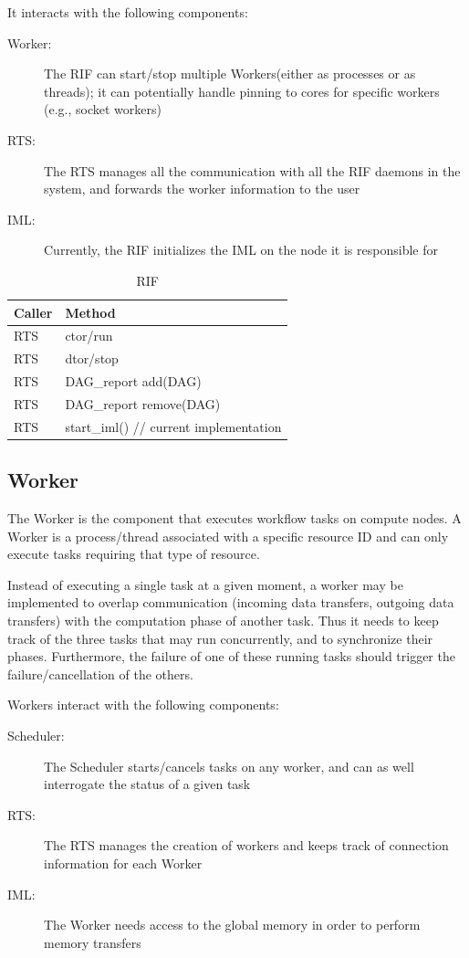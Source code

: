 \documentclass[10pt]{article}
\newcommand{\rts}{RTS\xspace}
\newcommand{\sched}{Scheduler\xspace}
\newcommand{\worker}{Worker\xspace}
\newcommand{\workers}{Workers\xspace}
\newcommand{\iml}{IML\xspace}
\newcommand{\rif}{RIF\xspace}
\newcommand{\rdag}{DAG\xspace}
\newcommand{\rdagrep}{DAG\_report\xspace}
\begin{document}
It interacts with the following components:
\begin{description}
    \item [\worker:] The \rif can start/stop multiple \workers (either as
    processes or as threads); it can potentially handle pinning to cores for
    specific workers (e.g., socket workers)
    \item [\rts:] The \rts manages all the communication with all the \rif
    daemons in the system, and forwards the worker information to the user
    \item [\iml:] Currently, the \rif initializes the \iml on the node it is 
    responsible for
\end{description}
%
\begin{table}[ht]
    \centering
    \caption{RIF}
    \label{tab:rif}
    \bgroup
    \setlength{\tabcolsep}{2em}
    \begin{tabular}{ll}
        \toprule
        Caller & Method \\
        \midrule
        \rts & ctor/run \\
        \rts & dtor/stop \\
        \rts & \rdagrep add(\rdag)  \\
        \rts & \rdagrep remove(\rdag) \\
        \midrule
        \rts & start\_iml() // current implementation \\
        \bottomrule
    \end{tabular}
    \egroup
\end{table}
%

\subsection{Worker}
The \worker is the component that executes workflow tasks on compute nodes. A
\worker is a process/thread associated with a specific resource ID and can only
execute tasks requiring that type of resource.

Instead of executing a single task at a given moment, a worker may be
implemented to overlap communication (incoming data transfers, outgoing data
transfers) with the computation phase of another task.
Thus it needs to keep track of the three tasks that may run concurrently, and to
synchronize their phases.
Furthermore, the failure of one of these running tasks should  trigger the
failure/cancellation of the others.

\workers interact with the following components:
\begin{description}
    \item [\sched:] The \sched starts/cancels tasks on any worker, and can as
    well interrogate the status of a given task
    \item [\rts:] The \rts manages the creation of workers and keeps track of
    connection information for each \worker
    \item [\iml:] The \worker needs access to the global memory in order to
    perform memory transfers
\end{description}
\end{document}
